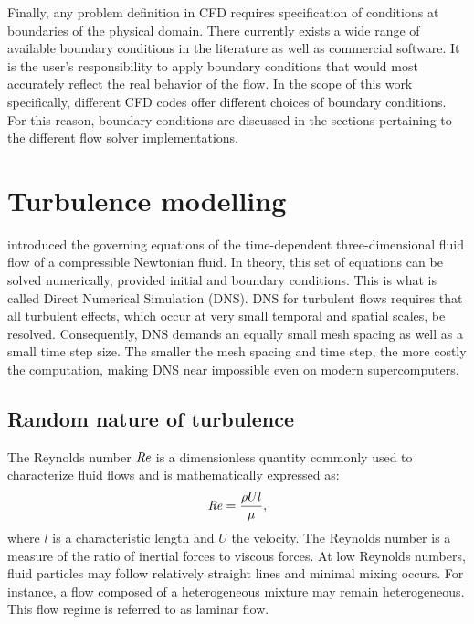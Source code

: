 %
Finally, any problem definition in CFD requires specification of conditions at boundaries of the physical domain. There currently exists a wide range of available boundary conditions in the literature as well as commercial software. It is the user's responsibility to apply boundary conditions that would most accurately reflect the real behavior of the flow. In the scope of this work specifically, different CFD codes offer different choices of boundary conditions. For this reason, boundary conditions are discussed in the sections pertaining to the different flow solver implementations.
%
%
\section{Turbulence modelling}
\label{sec:turb}
%
 introduced the governing equations of the time-dependent three-dimensional fluid flow of a compressible Newtonian fluid. In theory, this set of equations can be solved numerically, provided initial and boundary conditions. This is what is called Direct Numerical Simulation (DNS). DNS for turbulent flows requires that all turbulent effects, which occur at very small temporal and spatial scales, be resolved. Consequently, DNS demands an equally small mesh spacing as well as a small time step size. The smaller the mesh spacing and time step, the more costly the computation, making DNS near impossible even on modern supercomputers.
%
\subsection{Random nature of turbulence}
%
The Reynolds number $\mbox{\textit{Re}}$ is a dimensionless quantity commonly used to characterize fluid flows and is mathematically expressed as:
\begin{equation*}
    \mbox{\textit{Re}} = \frac{\rho U l}{\mu},
\end{equation*}
where $l$ is a characteristic length and $U$ the velocity. The Reynolds number is a measure of the ratio of inertial forces to viscous forces. At low Reynolds numbers, fluid particles may follow relatively straight lines and minimal mixing occurs. For instance, a flow composed of a heterogeneous mixture may remain heterogeneous. This flow regime is referred to as laminar flow.

